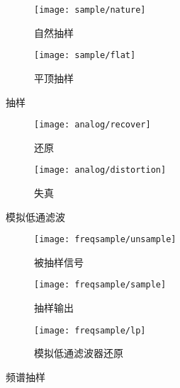 \documentclass[../main]{subfiles}
\begin{document}
\begin{figure}[htbp]
  \centering
  \begin{subfigure}[htbp]{0.45\linewidth}
    \centering
    \texttt{[image: sample/nature]}
    \caption{自然抽样}%
    \label{fig:sample/nature}
  \end{subfigure}
  \quad
  \begin{subfigure}[htbp]{0.45\linewidth}
    \centering
    \texttt{[image: sample/flat]}
    \caption{平顶抽样}%
    \label{fig:sample/flat}
  \end{subfigure}
  \caption{抽样}%
  \label{fig:sample}
\end{figure}

\begin{figure}[htbp]
  \centering
  \begin{subfigure}[htbp]{0.45\linewidth}
    \centering
    \texttt{[image: analog/recover]}
    \caption{还原}%
    \label{fig:analog/recover}
  \end{subfigure}
  \quad
  \begin{subfigure}[htbp]{0.45\linewidth}
    \centering
    \texttt{[image: analog/distortion]}
    \caption{失真}%
    \label{fig:analog/distortion}
  \end{subfigure}
  \caption{模拟低通滤波}%
  \label{fig:analog}
\end{figure}

\begin{figure}[htbp]
  \centering
  \begin{subfigure}[htbp]{0.45\linewidth}
    \centering
    \texttt{[image: freqsample/unsample]}
    \caption{被抽样信号}%
    \label{fig:freqsample/unsample}
  \end{subfigure}
  \quad
  \begin{subfigure}[htbp]{0.45\linewidth}
    \centering
    \texttt{[image: freqsample/sample]}
    \caption{抽样输出}%
    \label{fig:freqsample/sample}
  \end{subfigure}

  \begin{subfigure}[htbp]{0.45\linewidth}
    \centering
    \texttt{[image: freqsample/lp]}
    \caption{模拟低通滤波器还原}%
    \label{fig:freqsample/lp}
  \end{subfigure}
  \caption{频谱抽样}%
  \label{fig:freqsample}
\end{figure}
\end{document}
